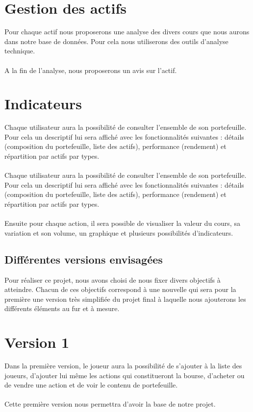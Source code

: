 \section{Gestion des actifs}
Pour chaque actif nous proposerons une analyse des divers cours que nous aurons dans notre base de données. Pour cela nous utiliserons des outils d’analyse technique. \\ \\
A la fin de l’analyse, nous proposerons un avis sur l’actif. 

\section{Indicateurs}
Chaque utilisateur aura la possibilité de consulter l’ensemble de son portefeuille. Pour cela un descriptif lui sera affiché avec les fonctionnalités suivantes : détails (composition du portefeuille, liste des actifs), performance (rendement) et répartition par actifs par types. \\ \\
Chaque utilisateur aura la possibilité de consulter l’ensemble de son portefeuille. Pour cela un descriptif lui sera affiché avec les fonctionnalités suivantes : détails (composition du portefeuille, liste des actifs), performance (rendement) et répartition par actifs par types. \\ \\
Ensuite pour chaque action, il sera possible de visualiser la valeur du cours, sa variation et son volume, un graphique et plusieurs possibilités d’indicateurs. 


\subsection{Différentes versions envisagées}
Pour réaliser ce projet, nous avons choisi de nous fixer divers objectifs à atteindre. Chacun de ces objectifs correspond à une nouvelle qui sera pour la première une version très simplifiée du projet final à laquelle nous ajouterons les différents éléments au fur et à mesure. \\ 
\section{Version 1}
Dans la première version, le joueur aura la possibilité de s'ajouter à la liste des joueurs, d'ajouter lui même les actions qui constitueront la bourse, d'acheter ou de vendre une action et de voir le contenu de portefeuille. \\ \\
Cette première version nous permettra d'avoir la base de notre projet. 

